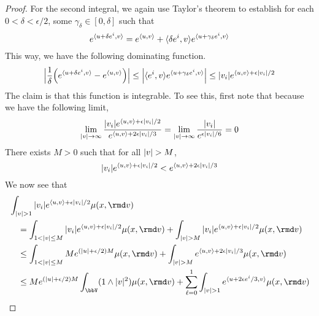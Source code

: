 \begin{proof}
  For the second integral, we again use Taylor's theorem to establish for each $0 < \delta < \epsilon/2$, some $\gamma_\delta \in [0,\delta]$ such that
  \begin{equation}
    e^{\langle u+\delta e^i , v \rangle} = e^{\langle u , v \rangle} + {\langle \delta e^i , v \rangle} e^{\langle u+\gamma_\delta e^i , v \rangle}
  \end{equation}
  This way, we have the following dominating function.
  \begin{equation}
    \Big| \frac1\delta \Big( e^{\langle u+\delta e^i , v \rangle} - e^{\langle u , v \rangle} \Big) \Big| 
    \leq \Big|{\langle e^i , v \rangle} e^{\langle u+\gamma_\delta e^i , v \rangle} \Big|
    \leq |v_i| e^{{\langle u , v \rangle} + \epsilon|v_i|/2}
  \end{equation}
  The claim is that this function is integrable.
  To see this, first note that because we have the following limit,
  \begin{equation}
    \lim_{|v|\rightarrow\infty} \frac{|v_i|e^{{\langle u , v \rangle}+\epsilon|v_i|/2}}{e^{{\langle u , v \rangle}+2\epsilon|v_i|/3}} = \lim_{|v|\rightarrow\infty} \frac{|v_i|}{e^{\epsilon|v_i|/6}} =  0
  \end{equation}
  There exists $M > 0$ such that for all $|v| > M$, 
  \begin{equation}
    |v_i| e^{{\langle u , v \rangle} + \epsilon|v_i|/2} < e^{{\langle u , v \rangle} + 2\epsilon|v_i|/3}
  \end{equation}
  We now see that
  \begin{align}
    &\int_{|\markVar| > 1} |\markVar_i| e^{\prj{\momentVar}{\markVar} + \epsilon|\markVar_i|/2} \affJump(\stateVar,\rmd\markVar) \\
    &\quad=\int_{1 < |\markVar|\leq M} |\markVar_i| e^{\prj{\momentVar}{\markVar} + \epsilon|\markVar_i|/2} \affJump(\stateVar,\rmd\markVar) +  \int_{|\markVar| > M} |\markVar_i| e^{\prj{\momentVar}{\markVar} + \epsilon|\markVar_i|/2} \affJump(\stateVar,\rmd\markVar) \\
    &\quad\leq \int_{1 < |\markVar| \leq M} M e^{(|\momentVar|+\epsilon/2)M} \affJump(\stateVar,\rmd\markVar) + \int_{|\markVar| > M} e^{\prj{\momentVar}{\markVar} + 2\epsilon|\markVar_i|/3} \affJump(\stateVar,\rmd\markVar) \\
    &\quad\leq Me^{(|\momentVar|+\epsilon/2)M} \int_\vecSpace (1 \wedge |\markVar|^2) \affJump(\stateVar,\rmd\markVar) + \sum_{\ell=0}^1 \int_{|\markVar|>1} e^\prj{\momentVar+2\epsilon \basisVec^i/3}{\markVar} \affJump(\stateVar,\rmd\markVar) \\

\end{align}
\end{proof}
